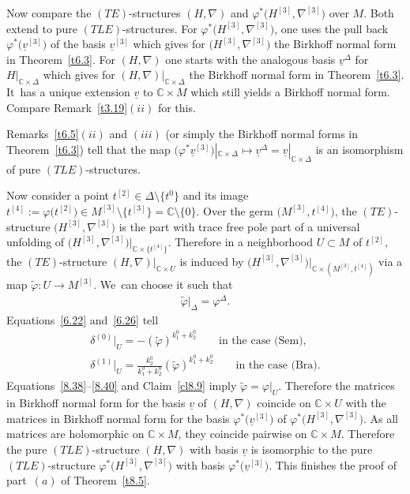 \documentclass[10pt,a4paper]{amsart}
\numberwithin{equation}{section}
\numberwithin{figure}{section}
\newcommand{\C}{{\mathbb C}}
\newcommand{\www}{\widetilde}
\newcommand{\uuuu}{\underline}
\newcommand{\nnn}{\nabla}
\begin{document}
Now compare the $(TE)$-structures $(H,\nnn)$ and
$\varphi^*\big(H^{[3]},\nnn^{[3]}\big)$ over $M$.
Both extend to pure $(TLE)$-structures.
For $\varphi^*\big(H^{[3]},\nnn^{[3]}\big)$, one uses the
pull back $\varphi^*\big(\uuuu{v}^{[3]}\big)$ of the basis
$\uuuu{v}^{[3]}$ which gives for $\big(H^{[3]},\nnn^{[3]}\big)$
the Birkhoff normal form in Theorem~\ref{t6.3}.
For $(H,\nnn)$ one starts with the analogous basis
$\uuuu{v}^\Delta$ for $H|_{\C\times\Delta}$ which gives
for $(H,\nnn)|_{\C\times\Delta}$ the Birkhoff normal form
in Theorem~\ref{t6.3}. It~has a unique extension $\uuuu{v}$ to
$\C\times M$ which still yields a Birkhoff normal form.
Compare Remark~\ref{t3.19}$(ii)$ for this.

Remarks~\ref{t6.5}$(ii)$ and $(iii)$ (or simply
the Birkhoff normal forms in Theorem~\ref{t6.3}) tell that
the map $\big(\varphi^*\uuuu{v}^{[3]}\big)|_{\C\times\Delta}
\mapsto \uuuu{v}^\Delta=\uuuu{v}|_{\C\times\Delta}$ is an
isomorphism of pure $(TLE)$-structures.

Now consider a point $t^{[2]}\in \Delta\setminus \big\{t^0\big\}$ and
its image $t^{[4]}:=\varphi\big(t^{[2]}\big)\in
M^{[3]}\setminus \big\{t^{[3]}\big\} =\C\setminus\{0\}$. Over the germ
$\big(M^{[3]},t^{[4]}\big)$, the $(TE)$-structure $\big(H^{[3]},\nnn^{[3]}\big)$
is the part with trace free pole part of a universal
unfolding of $\big(H^{[3]},\nnn^{[3]}\big)|_{\C\times\{t^{[4]}\}}$.
Therefore in a neighborhood $U\subset M$ of $t^{[2]}$,
the $(TE)$-structure $(H,\nnn)|_{\C\times U}$
is induced by
$\big(H^{[3]},\nnn^{[3]}\big)|_{\C\times(M^{[3]},t^{[4]})}$
via a map $\www\varphi\colon U\to M^{[3]}$.
We~can choose it such that
\begin{gather}\label{8.38}
\www\varphi|_\Delta=\varphi^\Delta.
\end{gather}
Equations~\eqref{6.22} and~\eqref{6.26} tell
\begin{gather}\label{8.39}
\delta^{(0)}|_U = -(\www\varphi)^{k_1^0+k_2^0}
\qquad\text{in the case (Sem)},
\\
\delta^{(1)}|_U =
\frac{k_2^0}{k_1^0+k_2^0}(\www\varphi)^{k_1^0+k_2^0}
\qquad\text{in the case (Bra)}.\label{8.40}
\end{gather}
Equations~\eqref{8.38}--\eqref{8.40} and Claim~\ref{cl8.9} imply
$\www\varphi=\varphi|_U$.
Therefore the matrices in Birkhoff normal form
for the basis $\uuuu{v}$ of $(H,\nnn)$ coincide
on $\C\times U$ with the matrices in Birkhoff normal form
for the basis $\varphi^*\big(\uuuu{v}^{[3]}\big)$ of
$\varphi^*\big(H^{[3]},\nnn^{[3]}\big)$.
As all matrices are holomorphic on $\C\times M$,
they coincide pairwise on $\C\times M$.
Therefore the pure $(TLE)$-structure $(H,\nnn)$
with basis $\uuuu{v}$ is isomorphic to the pure
$(TLE)$-structure $\varphi^*\big(H^{[3]},\nnn^{[3]}\big)$
with basis $\varphi^*\big(\uuuu{v}^{[3]}\big)$.
This finishes the proof of part~$(a)$ of Theorem~\ref{t8.5}.
\end{document}
